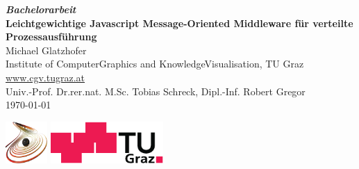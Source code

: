 \documentclass[10pt,a4paper,onecolumn]{book}
\newcommand{\wwwLink}[1]{\href{http://#1}{\textsf{#1}}}
\begin{document}
\frontmatter

\begin{titlepage}
\begin{center}
\vspace*{30mm}\Large

\textbf{\textit{Bachelorarbeit}}\\[12mm]

\textbf{\textsf{\huge Leichtgewichtige Javascript Message-Oriented Middleware für verteilte Prozessausführung}}\\[5mm]


Michael Glatzhofer \\[6pt]
Institute of ComputerGraphics and KnowledgeVisualisation, TU Graz\\[6pt]
\wwwLink{www.cgv.tugraz.at}\\[3em]


Univ.-Prof. Dr.rer.nat. M.Sc. Tobias Schreck, Dipl.-Inf. Robert Gregor \\
\today


\vspace*{\fill}

\includegraphics[height=16mm]{cgv-logo} \quad
\includegraphics[height=16mm]{tug-logo}
\end{center}
\end{titlepage}

\tableofcontents

\mainmatter











{}
\listoffigures
{}
\twocolumn
\printindex
\end{document}
